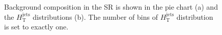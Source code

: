 \begin{figure}[H]
  \centering
  \caption{Background composition in the SR is shown in the pie chart (a) and the $H_{\text{T}}^{\text{jets}}$ distributions (b). The number of bins of $H_{\text{T}}^{\text{jets}}$ distribution is set to exactly one.}
  \label{fig:BkgComposition_SR_CC}
\end{figure}

